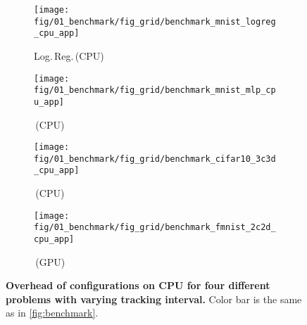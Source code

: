\captionsetup[subfigure]{justification=justified,singlelinecheck=false}

\begin{figure}[t]
	\centering
	\begin{subfigure}[t]{0.4\textwidth}
		\caption{\mnist Log.\,Reg.\,(CPU)}
		\texttt{[image: fig/01\_benchmark/fig\_grid/benchmark\_mnist\_logreg\_cpu\_app]}
		\label{fig:app_benchmark_configurations_cpu-mnist_logreg}
	\end{subfigure}
	\hspace{0.06\textwidth}
	\begin{subfigure}[t]{0.4\textwidth}
		\caption{\mnist \mlp\,(CPU)}
		\texttt{[image: fig/01\_benchmark/fig\_grid/benchmark\_mnist\_mlp\_cpu\_app]}
		\label{fig:app_benchmark_configurations_cpu-mnist_mlp}
		\vspace{0.25cm}
	\end{subfigure}
	\begin{subfigure}[t]{0.4\textwidth}
		\caption{\cifarten \threecthreed\,(CPU)}
		\texttt{[image: fig/01\_benchmark/fig\_grid/benchmark\_cifar10\_3c3d\_cpu\_app]}
		\label{fig:app_benchmark_configurations_cpu-cifar}
	\end{subfigure}
	\hspace{0.06\textwidth}
	\begin{subfigure}[t]{0.4\textwidth}
		\caption{\fmnist \twoctwod\,(GPU)}
		\texttt{[image: fig/01\_benchmark/fig\_grid/benchmark\_fmnist\_2c2d\_cpu\_app]}
		\label{fig:app_benchmark_configurations_cpu-fmnist}
	\end{subfigure}
	\caption{\textbf{Overhead of \cockpittitle configurations on CPU for four
			different problems with varying tracking interval.} Color bar is the same as in \autoref{fig:benchmark}.}
	\label{fig:app_benchmark_configurations_cpu}
\end{figure}

\captionsetup[subfigure]{justification=centering, singlelinecheck=true}

